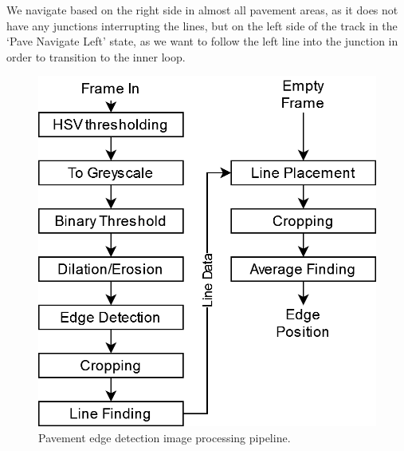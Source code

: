 \documentclass[titlepage, twocolumn]{article}
\begin{document}
            We navigate based on the right side in almost all pavement areas, as it does not have any junctions interrupting the lines, but on the left side of the track in the `Pave Navigate Left' state, as we want to follow the left line into the junction in order to transition to the inner loop. 

            \begin{figure}
                \begin{center}
                    \includegraphics[width=0.80\linewidth]{pavepipeline.png}
                \end{center}
                \caption{Pavement edge detection image processing pipeline.}
                \label{fig:pavepipeline}
            \end{figure}
\end{document}
